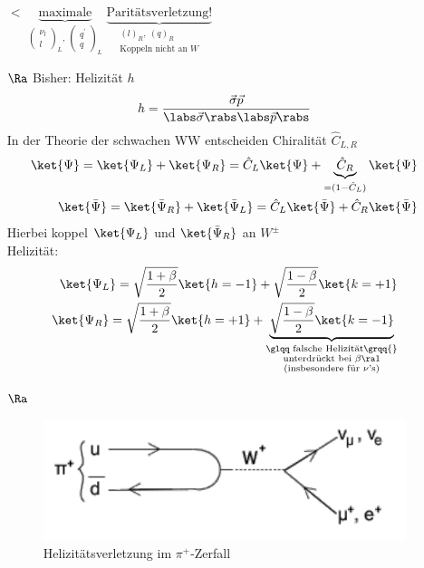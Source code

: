\begin{itemize}
\item[$\lt$] $\underbrace{\text{maximale}}_{\begin{pmatrix}
\nu_l\\l\end{pmatrix}_L, \ \begin{pmatrix}
q^\prime \\ q \end{pmatrix}_L}$ $\underbrace{\text{Paritätsverletzung!}}_{\substack{(l)_R, \ (q)_R\\\text{Koppeln nicht an $W$}}}$
\item[$\Ra$] Bisher: Helizität $h$
\begin{align}
h = \frac{\vec{\sigma}\vec{p}}{\labs \vec{\sigma}\rabs \labs \vec{p} \rabs}
\end{align}
In der Theorie der schwachen WW entscheiden \glqq Chiralität\grqq{} $\hat{C}_{L,R}$
\begin{align*}
\ket{\Psi} = \ket{\Psi_L} + \ket{\Psi_R} = \hat{C}_L \ket{\Psi} + \underbrace{\hat{C}_R}_{= (1-\hat{C}_L)}\ket{\Psi}\\
\ket{\bar{\Psi}} = \ket{\bar{\Psi}_R} + \ket{\bar{\Psi}_L} = \hat{C}_L \ket{\bar{\Psi}} + \hat{C}_R\ket{\bar{\Psi}}
\end{align*}
Hierbei koppel $\ket{\Psi_L}$ und $\ket{\bar{\Psi}_R}$ an $W^\pm$\\
Helizität:
\begin{align*}
\ket{\Psi_L} = \sqrt{\frac{1+\beta}{2}} \ket{h=-1} + \sqrt{\frac{1-\beta}{2}} \ket{k=+1}\\
\ket{\Psi_R} = \sqrt{\frac{1+\beta}{2}} \ket{h=+1} + \underbrace{\sqrt{\frac{1-\beta}{2}} \ket{k=-1}}_{\substack{\text{\glqq falsche Helizität\grqq{}}\\\text{unterdrückt bei } \beta \ra 1\\\text{(insbesondere für $\nu$'s)}}}
\end{align*}
\item[$\Ra$] 

\begin{figure}[!ht]
\centering
\includegraphics[width=.5\textwidth]{imgs/ep5-fig-8-8.pdf}
\caption{Helizitätsverletzung im $\pi^+$-Zerfall \label{fig:8.8}}
\end{figure}


\end{itemize}
